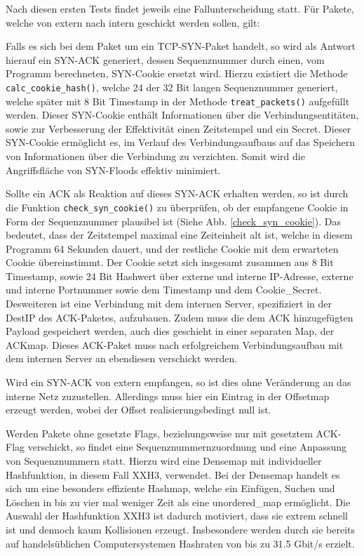\documentclass[../review_2.tex]{subfiles}
\begin{document}
Nach diesen ersten Tests findet jeweils eine Fallunterscheidung statt. Für Pakete, welche von extern nach intern geschickt werden sollen, gilt:

Falls es sich bei dem Paket um ein TCP-SYN-Paket handelt, so wird als Antwort hierauf ein SYN-ACK generiert, dessen Sequenznummer durch einen, vom Programm berechneten, SYN-Cookie ersetzt wird. Hierzu existiert die Methode \texttt{calc\_cookie\_hash()}, welche 24 der 32 Bit langen Sequenznummer generiert, welche später mit 8 Bit Timestamp in der Methode \texttt{treat\_packets()} aufgefüllt werden. Dieser SYN-Cookie enthält Informationen über die Verbindungsentitäten, sowie zur Verbesserung der Effektivität einen Zeitstempel und ein Secret. Dieser SYN-Cookie ermöglicht es, im Verlauf des Verbindungsaufbaus auf das Speichern von Informationen über die Verbindung zu verzichten. Somit wird die Angriffsfläche von SYN-Floods effektiv minimiert.

Sollte ein ACK als Reaktion auf dieses SYN-ACK erhalten werden, so ist durch die Funktion \texttt{check\_syn\_cookie()} zu überprüfen, ob der empfangene Cookie in Form der Sequenznummer plausibel ist (Siehe Abb. \ref{check_syn_cookie}). Das bedeutet, dass der Zeitstempel maximal eine Zeiteinheit alt ist, welche in diesem Programm 64 Sekunden dauert, und der restliche Cookie mit dem erwarteten Cookie übereinstimmt. Der Cookie setzt sich insgesamt zusammen aus 8 Bit Timestamp, sowie 24 Bit Hashwert über externe und interne IP-Adresse, externe und interne Portnummer sowie dem Timestamp und dem Cookie\_Secret.
Desweiteren ist eine Verbindung mit dem internen Server, spezifiziert in der DestIP des ACK-Paketes, aufzubauen. Zudem muss die dem ACK hinzugefügten Payload gespeichert werden, auch dies geschieht in einer separaten Map, der ACKmap. Dieses ACK-Paket muss nach erfolgreichem Verbindungsaufbau mit dem internen Server an ebendiesen verschickt werden.

Wird ein SYN-ACK von extern empfangen, so ist dies ohne Veränderung an das interne Netz zuzustellen. Allerdings muss hier ein Eintrag in der Offsetmap erzeugt werden, wobei der Offset realisierungsbedingt null ist.

Werden Pakete ohne gesetzte Flags, beziehungsweise nur mit gesetztem ACK-Flag verschickt, so findet eine Sequenznummernzuordnung und eine Anpassung von Sequenznummern statt. Hierzu wird eine Densemap mit individueller Hashfunktion, in diesem Fall XXH3, verwendet. Bei der Densemap handelt es sich um eine besonders effiziente Hashmap, welche ein Einfügen, Suchen und Löschen in bis zu vier mal weniger Zeit als eine unordered\_map ermöglicht. Die Auswahl der Hashfunktion XXH3 ist  dadurch motiviert, dass sie extrem schnell ist und dennoch kaum Kollisionen erzeugt. Insbesondere werden durch sie bereits auf handelsüblichen Computersystemen Hashraten von bis zu 31.5 Gbit/s erzielt.
\end{document}
